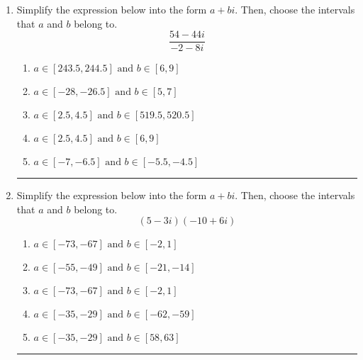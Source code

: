 \documentclass[14pt]{extbook}
\newcommand{\litem}[1]{\item#1\hspace*{-1cm}\rule{\textwidth}{0.4pt}}
\begin{document}
\begin{enumerate}
{\begin{enumerate}[label=\Alph*.]
\end{enumerate} }
\litem{
Simplify the expression below into the form $a+bi$. Then, choose the intervals that $a$ and $b$ belong to.\[ \frac{54 - 44 i}{-2 - 8 i} \]\begin{enumerate}[label=\Alph*.]
\item \( a \in [243.5, 244.5] \text{ and } b \in [6, 9] \)
\item \( a \in [-28, -26.5] \text{ and } b \in [5, 7] \)
\item \( a \in [2.5, 4.5] \text{ and } b \in [519.5, 520.5] \)
\item \( a \in [2.5, 4.5] \text{ and } b \in [6, 9] \)
\item \( a \in [-7, -6.5] \text{ and } b \in [-5.5, -4.5] \)

\end{enumerate} }
\litem{
Simplify the expression below into the form $a+bi$. Then, choose the intervals that $a$ and $b$ belong to.\[ (5 - 3 i)(-10 + 6 i) \]\begin{enumerate}[label=\Alph*.]
\item \( a \in [-73, -67] \text{ and } b \in [-2, 1] \)
\item \( a \in [-55, -49] \text{ and } b \in [-21, -14] \)
\item \( a \in [-73, -67] \text{ and } b \in [-2, 1] \)
\item \( a \in [-35, -29] \text{ and } b \in [-62, -59] \)
\item \( a \in [-35, -29] \text{ and } b \in [58, 63] \)

\end{enumerate} }
\end{enumerate}
\end{document}
